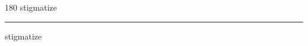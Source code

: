 
\begin{frame}
\begin{center}
\begin{turn}{180}
{\fontsize{2.5cm}{1em}\selectfont stigmatize}
\end{turn}
\vspace{1em}\par  
\hrule
\vspace{1em}\par  
{\fontsize{2.5cm}{1em}\selectfont stigmatize}
\end{center}
\end{frame}
